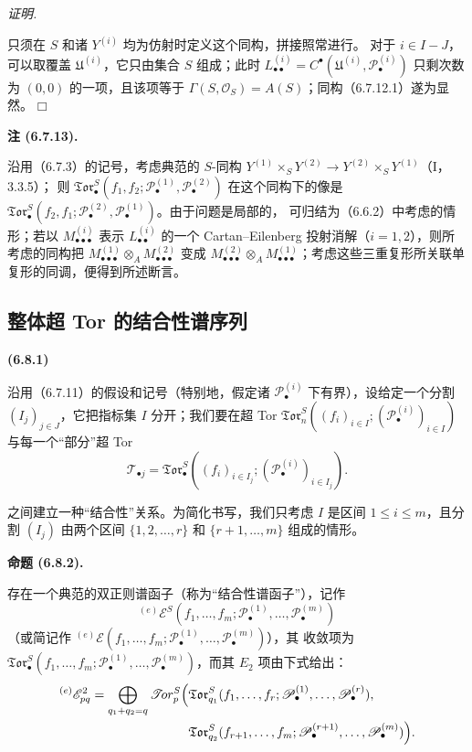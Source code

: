 \documentclass[UTF8,fontset=none,11pt,oneside,openany]{ctexbook}
\providecommand{\square}{\mdlgwhtsquare}
\newenvironment{env}[1][]{%
  \par\medskip\noindent\textbf{(#1)}\ %
}{\par}
\newenvironment{proposition}[1][]{%
  \par\medskip\noindent\textbf{命题 (#1).}\ %
}{\par}
\newenvironment{remark}[1][]{%
  \par\medskip\noindent\textbf{注 (#1).}\ %
}{\par}
\newenvironment{proof}{%
  \par\smallskip\noindent\textit{证明.}\ %
}{\hfill$\square$\par}
\newcommand{\oldpage}[2][]{%
  \hypertarget{ega-source-page-#1-#2}{}%
  \marginnote{\scriptsize\textbf{#1}~|~#2}\ignorespaces}
\begin{document}
\begin{proof}
只须在 $S$ 和诸 $Y^{(i)}$ 均为仿射时定义这个同构，拼接照常进行。
对于 $i\in I-J$，可以取覆盖 $\mathfrak U^{(i)}$，它只由集合
$S$ 组成；此时
$L_{\bullet\bullet}^{(i)}=C^\bullet(\mathfrak U^{(i)},
\mathscr P_\bullet^{(i)})$ 只剩次数为 $(0,0)$ 的一项，且该项等于
$\Gamma(S,\mathscr O_S)=A(S)$；同构（6.7.12.1）遂为显然。
\end{proof}

\begin{remark}[6.7.13]
沿用（6.7.3）的记号，考虑典范的 $S$-同构
$Y^{(1)}\times_S Y^{(2)}\to Y^{(2)}\times_S Y^{(1)}$（I，3.3.5）；
则
$\mathfrak{Tor}_\bullet^S(f_1,f_2;
\mathscr P_\bullet^{(1)},\mathscr P_\bullet^{(2)})$ 在这个同构下的像是
$\mathfrak{Tor}_\bullet^S(f_2,f_1;
\mathscr P_\bullet^{(2)},\mathscr P_\bullet^{(1)})$。由于问题是局部的，
可归结为（6.6.2）中考虑的情形；若以
$M_{\bullet\bullet\bullet}^{(i)}$ 表示 $L_{\bullet\bullet}^{(i)}$ 的一个
Cartan--Eilenberg 投射消解（$i=1,2$），则所考虑的同构把
$M_{\bullet\bullet\bullet}^{(1)}\otimes_A
M_{\bullet\bullet\bullet}^{(2)}$ 变成
$M_{\bullet\bullet\bullet}^{(2)}\otimes_A
M_{\bullet\bullet\bullet}^{(1)}$；考虑这些三重复形所关联单复形的同调，便得到所述断言。
\end{remark}

\subsection{整体超 Tor 的结合性谱序列}

\begin{env}[6.8.1]
沿用（6.7.11）的假设和记号（特别地，假定诸
$\mathscr P_\bullet^{(i)}$ 下有界），设给定一个分割
$(I_j)_{j\in J}$，它把指标集 $I$ 分开；我们要在超 Tor
$\mathfrak{Tor}_n^S((f_i)_{i\in I};(\mathscr P_\bullet^{(i)})_{i\in I})$
与每一个“部分”超 Tor
\[
  \mathcal T_{\bullet j}
  =\mathfrak{Tor}_\bullet^S
  ((f_i)_{i\in I_j};(\mathscr P_\bullet^{(i)})_{i\in I_j}).
\]

\oldpage[III]{165}
之间建立一种“结合性”关系。为简化书写，我们只考虑 $I$ 是区间
$1\leq i\leq m$，且分割 $(I_j)$ 由两个区间
$\{1,2,\ldots,r\}$ 和 $\{r+1,\ldots,m\}$ 组成的情形。
\end{env}

\begin{proposition}[6.8.2]
存在一个典范的双正则谱函子（称为“结合性谱函子”），记作
\[
  {}^{(e)}\mathscr E^S
  (f_1,\ldots,f_m;
   \mathscr P_\bullet^{(1)},\ldots,\mathscr P_\bullet^{(m)})
\]
（或简记作 ${}^{(e)}\mathscr E(f_1,\ldots,f_m;
\mathscr P_\bullet^{(1)},\ldots,\mathscr P_\bullet^{(m)})$），其
收敛项为
$\mathfrak{Tor}_\bullet^S(f_1,\ldots,f_m;
\mathscr P_\bullet^{(1)},\ldots,\mathscr P_\bullet^{(m)})$，而其
$E_2$ 项由下式给出：
\[
\begin{split}
  {}^{(e)}\mathscr E_{pq}^2
  =\bigoplus_{q_1+q_2=q}
  \mathscr{T}\!or_p^S\Bigl(
  &\mathfrak{Tor}_{q_1}^S
  (f_1,\ldots,f_r;
   \mathscr P_\bullet^{(1)},\ldots,\mathscr P_\bullet^{(r)}),\\
  &\mathfrak{Tor}_{q_2}^S
  (f_{r+1},\ldots,f_m;
   \mathscr P_\bullet^{(r+1)},\ldots,\mathscr P_\bullet^{(m)})
  \Bigr).
\end{split}
\]
\end{proposition}
\end{document}
